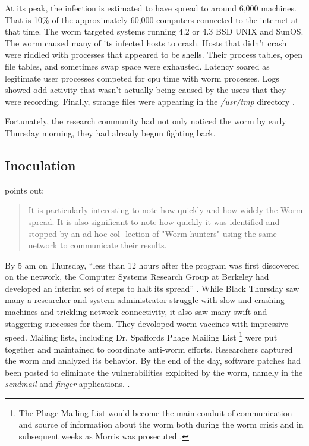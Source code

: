 At its peak, the infection is estimated to have spread to around 6,000 machines.
That is 10\% of the approximately 60,000 computers connected to the internet at
that time\cite{eichin_microscope_1989}\cite{marsan_morris_2008}. The worm
targeted systems running 4.2 or 4.3 BSD UNIX and SunOS. The worm
caused many of its infected hosts to crash.
Hosts that didn't crash were riddled with processes that appeared to be shells.
Their process tables, open file tables, and sometimes swap space were exhausted.
Latency soared as legitimate user processes competed for cpu time with worm
processes. Logs showed odd activity that wasn't actually being caused by the
users that they were recording. Finally, strange files were appearing in the
\textit{/usr/tmp} directory \cite{seeley_tour_1989}\cite{spafford_crisis_1989}.

Fortunately, the research community had not only noticed the worm by early
Thursday morning, they had already begun fighting back.



\subsection*{Inoculation}

\cite{spafford_internet_1989-1} points out:
\begin{quote}
It is particularly interesting to note how quickly and how widely the Worm spread.
It is also significant to note how quickly it was identified and stopped by an ad hoc col-
lection of "Worm hunters" using the same network to communicate their results.
\end{quote}

By 5 am on Thursday, ``less than 12 hours after the program was first discovered on the network, the Computer Systems Research Group at Berkeley had
developed an interim set of steps to halt its spread''
\cite{spafford_crisis_1989}. While Black Thursday saw many a researcher and
system administrator struggle with slow and crashing machines and trickling
network connectivity, it also saw many swift and staggering successes for them.
They devoloped worm vaccines with impressive speed. 
Mailing lists, including Dr. Spaffords Phage Mailing List
\footnote{
The Phage Mailing List would become the main conduit of communication and source
of information about the worm both during the worm crisis and in subsequent weeks as Morris
was prosecuted
\cite{spafford_crisis_1989}\cite{spafford_internet_1989-1}\cite{lee_washpost_2013}.
} 
were put together and maintained to coordinate anti-worm efforts.
Researchers captured the worm and analyzed its behavior. By the end of the day,
software patches had been posted to eliminate the vulnerabilities exploited by the worm, namely in the 
\textit{sendmail} and \textit{finger} applications.
\cite{spafford_crisis_1989}
\cite{seeley_tour_1989}.

